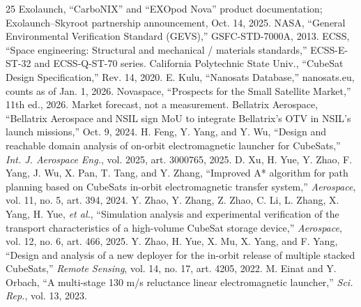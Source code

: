 \documentclass[conference]{IEEEtran}
\begin{document}
\begin{thebibliography}{25}
 Exolaunch, ``CarboNIX'' and ``EXOpod Nova'' product documentation; Exolaunch--Skyroot partnership announcement, Oct. 14, 2025.
 NASA, ``General Environmental Verification Standard (GEVS),'' GSFC-STD-7000A, 2013.
 ECSS, ``Space engineering: Structural and mechanical / materials standards,'' ECSS-E-ST-32 and ECSS-Q-ST-70 series.
 California Polytechnic State Univ., ``CubeSat Design Specification,'' Rev. 14, 2020.
 E. Kulu, ``Nanosats Database,'' nanosats.eu, counts as of Jan. 1, 2026.
 Novaspace, ``Prospects for the Small Satellite Market,'' 11th ed., 2026. Market forecast, not a measurement.
 Bellatrix Aerospace, ``Bellatrix Aerospace and NSIL sign MoU to integrate Bellatrix's OTV in NSIL's launch missions,'' Oct. 9, 2024.
 H. Feng, Y. Yang, and Y. Wu, ``Design and reachable domain analysis of on-orbit electromagnetic launcher for CubeSats,'' \emph{Int. J. Aerospace Eng.}, vol. 2025, art. 3000765, 2025.
 D. Xu, H. Yue, Y. Zhao, F. Yang, J. Wu, X. Pan, T. Tang, and Y. Zhang, ``Improved A* algorithm for path planning based on CubeSats in-orbit electromagnetic transfer system,'' \emph{Aerospace}, vol. 11, no. 5, art. 394, 2024.
 Y. Zhao, Y. Zhang, Z. Zhao, C. Li, L. Zhang, X. Yang, H. Yue, \emph{et al.}, ``Simulation analysis and experimental verification of the transport characteristics of a high-volume CubeSat storage device,'' \emph{Aerospace}, vol. 12, no. 6, art. 466, 2025.
 Y. Zhao, H. Yue, X. Mu, X. Yang, and F. Yang, ``Design and analysis of a new deployer for the in-orbit release of multiple stacked CubeSats,'' \emph{Remote Sensing}, vol. 14, no. 17, art. 4205, 2022.
 M. Einat and Y. Orbach, ``A multi-stage 130 m/s reluctance linear electromagnetic launcher,'' \emph{Sci. Rep.}, vol. 13, 2023.
\end{thebibliography}
\end{document}
